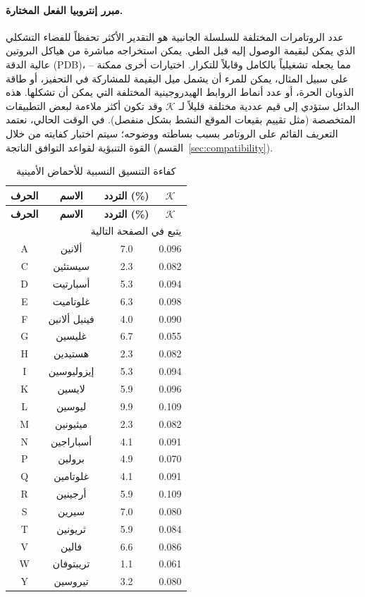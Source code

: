 \documentclass[11pt,a4paper]{article}
\newcommand{\REL}{\mathcal{K}}
\begin{document}
	\paragraph*{مبرر إنتروبيا الفعل المختارة.}
	عدد الروتامرات المختلفة للسلسلة الجانبية هو التقدير الأكثر تحفظاً للفضاء التشكلي الذي يمكن لبقيمة الوصول إليه قبل الطي.
	يمكن استخراجه مباشرة من هياكل البروتين عالية الدقة (PDB)، مما يجعله تشغيلياً بالكامل وقابلاً للتكرار.
	اختيارات أخرى ممكنة – على سبيل المثال، يمكن للمرء أن يشمل ميل البقيمة للمشاركة في التحفيز، أو طاقة الذوبان الحرة، أو عدد أنماط الروابط الهيدروجينية المختلفة التي يمكن أن تشكلها.
	هذه البدائل ستؤدي إلى قيم عددية مختلفة قليلاً لـ \(\REL\) وقد تكون أكثر ملاءمة لبعض التطبيقات المتخصصة (مثل تقييم بقيعات الموقع النشط بشكل منفصل).
	في الوقت الحالي، نعتمد التعريف القائم على الروتامر بسبب بساطته ووضوحه؛ سيتم اختبار كفايته من خلال القوة التنبؤية لقواعد التوافق الناتجة (القسم~\ref{sec:compatibility}).
	
	\begin{longtable}{|c|c|c|c|}
		\caption{كفاءة التنسيق النسبية للأحماض الأمينية}\label{tab:amino}\\
		\hline
		\textbf{الحرف} & \textbf{الاسم} & \textbf{التردد (\%)} & \(\REL\) \\
		\hline
		\endfirsthead
		\hline
		\textbf{الحرف} & \textbf{الاسم} & \textbf{التردد (\%)} & \(\REL\) \\
		\hline
		\endhead
		\hline
		\multicolumn{4}{r}{يتبع في الصفحة التالية}\\
		\endfoot
		\hline
		\endlastfoot
		A & ألانين & 7.0 & 0.096 \\
		C & سيستئين & 2.3 & 0.082 \\
		D & أسبارتيت & 5.3 & 0.094 \\
		E & غلوتاميت & 6.3 & 0.098 \\
		F & فينيل ألانين & 4.0 & 0.090 \\
		G & غليسين & 6.7 & 0.055 \\
		H & هستيدين & 2.3 & 0.082 \\
		I & إيزوليوسين & 5.3 & 0.094 \\
		K & لايسين & 5.9 & 0.096 \\
		L & ليوسين & 9.9 & 0.109 \\
		M & ميثيونين & 2.3 & 0.082 \\
		N & أسباراجين & 4.1 & 0.091 \\
		P & برولين & 4.9 & 0.070 \\
		Q & غلوتامين & 4.1 & 0.091 \\
		R & أرجينين & 5.9 & 0.109 \\
		S & سيرين & 7.0 & 0.080 \\
		T & ثريونين & 5.9 & 0.084 \\
		V & فالين & 6.6 & 0.086 \\
		W & تريبتوفان & 1.1 & 0.061 \\
		Y & تيروسين & 3.2 & 0.080 \\
		\hline
	\end{longtable}
	
\end{document}
